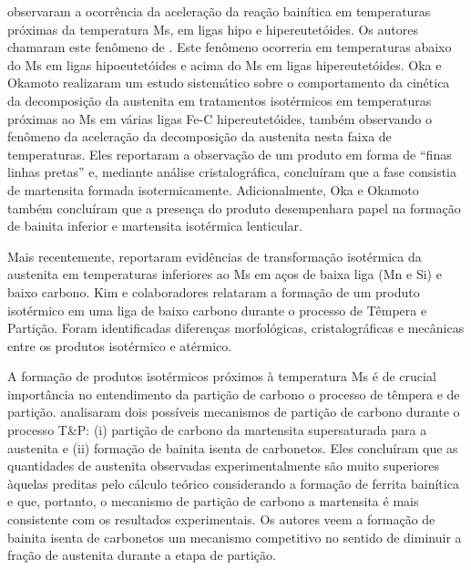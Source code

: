  observaram a ocorrência da aceleração da reação bainítica em temperaturas próximas da temperatura Ms, em ligas hipo e hipereutetóides. Os autores chamaram este fenômeno de . Este fenômeno ocorreria em temperaturas abaixo do Ms em ligas hipoeutetóides e acima do Ms em ligas hipereutetóides. Oka e Okamoto\cite{Okamoto1985,Oka1988} realizaram um estudo sistemático sobre o comportamento da cinética da decomposição da austenita em tratamentos isotérmicos em temperaturas próximas ao Ms em várias ligas Fe-C hipereutetóides, também observando o fenômeno da aceleração da decomposição da austenita nesta faixa de temperaturas. Eles reportaram a observação de um produto em forma de ``finas linhas pretas'' e, mediante análise cristalográfica, concluíram que a fase consistia de martensita formada isotermicamente. Adicionalmente, Oka e Okamoto também concluíram que a presença do produto desempenhara papel na formação de bainita inferior e martensita isotérmica lenticular.

Mais recentemente,  reportaram evidências de transformação isotérmica da austenita em temperaturas inferiores ao Ms em aços de baixa liga (Mn e Si) e baixo carbono. Kim e colaboradores\cite{Kim2010,Kim2012} relataram a formação de um produto isotérmico em uma liga de baixo carbono durante o processo de Têmpera e Partição. Foram identificadas diferenças morfológicas, cristalográficas e mecânicas entre os produtos isotérmico e atérmico.

A formação de produtos isotérmicos próximos à temperatura Ms é de crucial importância no entendimento da partição de carbono o processo de têmpera e de partição.  analisaram dois possíveis mecanismos de partição de carbono durante o processo T\&P: (i) partição de carbono da martensita supersaturada para a austenita e (ii) formação de bainita isenta de carbonetos. Eles concluíram que as quantidades de austenita observadas experimentalmente são muito superiores àquelas preditas pelo cálculo teórico considerando a formação de ferrita bainítica e que, portanto, o mecanismo de partição de carbono a martensita é mais consistente com os resultados experimentais. Os autores veem a formação de bainita isenta de carbonetos um mecanismo competitivo no sentido de diminuir a fração de austenita durante a etapa de partição.


